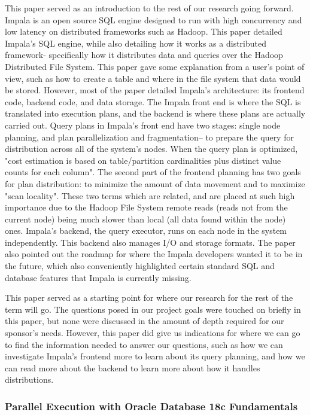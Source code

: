 \documentclass[onecolumn, draftclsnofoot,10pt, compsoc]{IEEEtran}
\begin{document}
This paper served as an introduction to the rest of our research going forward. 
Impala is an open source SQL engine designed to run with high concurrency and low latency on distributed frameworks such as Hadoop.
This paper detailed Impala's SQL engine, while also detailing how it works as a distributed framework- specifically how it distributes data and queries over the Hadoop Distributed File System.
This paper gave some explanation from a user's point of view, such as how to create a table and where in the file system that data would be stored. 
However, most of the paper detailed Impala's architecture: its frontend code, backend code, and data storage. 
The Impala front end is where the SQL is translated into execution plans, and the backend is where these plans are actually carried out.
Query plans in Impala's front end have two stages: single node planning, and plan parallelization and fragmentation-- to prepare the query for distribution across all of the system's nodes. 
When the query plan is optimized, "cost estimation is based on table/partition cardinalities plus distinct value counts for each column".
The second part of the frontend planning has two goals for plan distribution: to minimize the amount of data movement and to maximize "scan locality". 
These two terms which are related, and are placed at such high importance due to the Hadoop File System remote reads (reads not from the current node) being much slower than local (all data found within the node) ones.
Impala's backend, the query executor, runs on each node in the system independently.
This backend also manages I/O and storage formats.
The paper also pointed out the roadmap for where the Impala developers wanted it to be in the future, which also conveniently highlighted certain standard SQL and database features that Impala is currently missing. 

This paper served as a starting point for where our research for the rest of the term will go. 
The questions posed in our project goals were touched on briefly in this paper, but none were discussed in the amount of depth required for our sponsor’s needs.
However, this paper did give us indications for where we can go to find the information needed to answer our questions, such as how we can investigate Impala’s frontend more to learn about its query planning, and how we can read more about the backend to learn more about how it handles distributions. 

\subsubsection{Parallel Execution with Oracle Database 18c Fundamentals}
\end{document}
